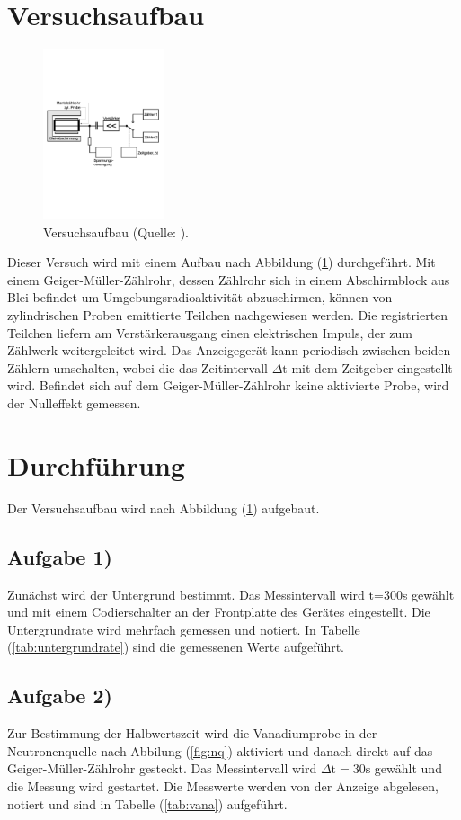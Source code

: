 \section{Versuchsaufbau}

\begin{figure}
            \centering
               \includegraphics[height=5cm]{aufbau.pdf}
               \caption{Versuchsaufbau (Quelle: \cite{V702}).}
               \label{fig:aufbau}
\end{figure}

\noindent
Dieser Versuch wird mit einem Aufbau nach Abbildung (\ref{fig:aufbau}) durchgeführt.
Mit einem Geiger-Müller-Zählrohr, dessen Zählrohr sich in einem Abschirmblock aus Blei befindet um Umgebungsradioaktivität abzuschirmen,
können von zylindrischen Proben emittierte Teilchen nachgewiesen werden.
Die registrierten Teilchen liefern am Verstärkerausgang einen elektrischen Impuls,
der zum Zählwerk weitergeleitet wird.
Das Anzeigegerät kann periodisch zwischen beiden Zählern umschalten, 
wobei die das Zeitintervall $\Delta \text{t}$ mit dem Zeitgeber eingestellt wird.
Befindet sich auf dem Geiger-Müller-Zählrohr keine aktivierte Probe, wird der Nulleffekt gemessen.

\section{Durchführung}
Der Versuchsaufbau wird nach Abbildung (\ref{fig:aufbau}) aufgebaut.

\subsection{Aufgabe 1)}
\noindent
Zunächst wird der Untergrund bestimmt. 
Das Messintervall wird t=300s gewählt und mit einem Codierschalter an der Frontplatte des Gerätes eingestellt.
Die Untergrundrate wird mehrfach gemessen und notiert.
In Tabelle (\ref{tab:untergrundrate}) sind die gemessenen Werte aufgeführt.

\subsection{Aufgabe 2)}
\noindent
Zur Bestimmung der Halbwertszeit wird die Vanadiumprobe in der Neutronenquelle nach Abbilung (\ref{fig:nq}) 
aktiviert und 
danach direkt auf das Geiger-Müller-Zählrohr gesteckt.
Das Messintervall wird $\Delta \text{t} = 30 \si{\second}$ gewählt und die Messung wird gestartet.
Die Messwerte werden von der Anzeige abgelesen, notiert und sind in Tabelle (\ref{tab:vana}) aufgeführt.


